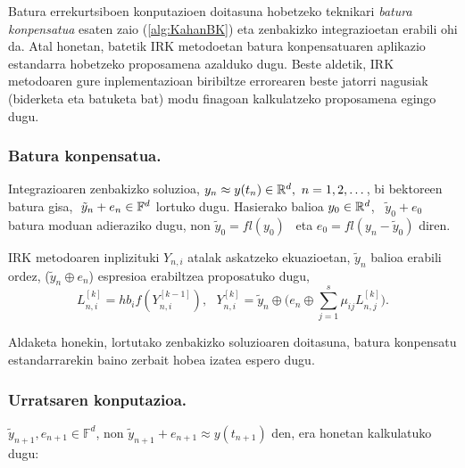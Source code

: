 Batura errekurtsiboen konputazioen doitasuna hobetzeko teknikari \emph{batura konpensatua} esaten zaio (\ref{alg:KahanBK}) eta zenbakizko integrazioetan erabili ohi da. Atal honetan, batetik IRK metodoetan batura konpensatuaren aplikazio estandarra hobetzeko proposamena azalduko dugu. Beste aldetik, IRK metodoaren gure  inplementazioan biribiltze errorearen beste jatorri nagusiak (biderketa eta batuketa bat) modu finagoan kalkulatzeko proposamena egingo dugu.    


\subsubsection*{Batura konpensatua.}

Integrazioaren zenbakizko soluzioa, $y_n \approx y(t_n) \in \mathbb{R}^{d}, \ n=1,2,\dots$, bi bektoreen batura gisa, $ \ \tilde{y}_n+e_n \in \mathbb{F}^{d}$ lortuko dugu. Hasierako balioa $y_0 \in \mathbb{R}^{d}$, \ $\tilde{y}_0+e_0$ batura moduan adieraziko dugu, non $\tilde{y}_0=fl(y_0)$~ eta $e_0=fl(y_n-\tilde{y}_0)$ diren. 

IRK metodoaren inplizituki $Y_{n,i}$ atalak askatzeko ekuazioetan, $\tilde {y}_n$ balioa erabili ordez, ($\tilde{y}_n \oplus e_{n}$) espresioa erabiltzea proposatuko dugu, 
\begin{equation}
\label{eq:eqbk}
L_{n,i}^{[k]}=hb_if(Y_{n,i}^{[k-1]}), \ \ \ Y_{n,i}^{[k]}=\tilde{y}_n \oplus \big(e_{n} \oplus \sum\limits_{j=1}^{s} \mu_{ij} L_{n,j}^{[k]}\big).
\end{equation}

Aldaketa honekin, lortutako zenbakizko soluzioaren doitasuna, batura konpensatu estandarrarekin baino zerbait hobea izatea espero dugu. 

\subsubsection*{Urratsaren konputazioa.}

$\tilde{y}_{n+1}, e_{n+1} \in \mathbb{F}^d$, non $\tilde{y}_{n+1}+e_{n+1}\approx y(t_{n+1})$ den, era honetan kalkulatuko dugu:

